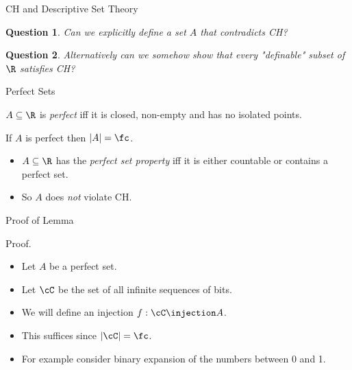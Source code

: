 \documentclass{beamer}
\newtheorem*{question}{Question}
\begin{document}
\begin{frame}{CH and Descriptive Set Theory}

\begin{question}
Can we explicitly define a set $A$ that contradicts CH?
\end{question}

\begin{question}
Alternatively can we somehow show that every "definable" subset of
$\R$ satisfies CH?
\end{question}

\end{frame}

\begin{frame}{Perfect Sets}

\begin{definition}
$A\subseteq\R$ is \emph{perfect} iff it is closed, non-empty
and has no isolated points.
\end{definition}

\begin{lemma}
If $A$ is perfect then $|A| = \fc$.
\end{lemma}

\begin{definition}
\begin{itemize}
  \item $A\subseteq\R$ has the \emph{perfect set property} iff it is either
  countable or contains a perfect set.
  \item So $A$ does \emph{not} violate CH.
\end{itemize}
\end{definition}
\end{frame}

\begin{frame}{Proof of Lemma}

\begin{block}{Proof.}
\begin{itemize}
  \item  Let $A$ be a perfect set.

  \item  Let $\cC$ be the set of all infinite sequences of bits.

  \item  We will define an injection $f : \cC \injection A$.

  \item  This suffices since $|\cC| = \fc$.

  \item  For example consider binary expansion of the numbers between 0 and 1.

\end{itemize}
\end{block}
\end{frame}
\end{document}
